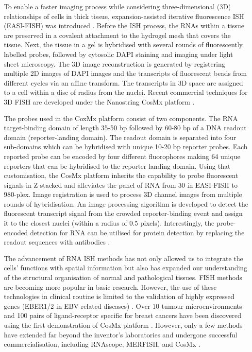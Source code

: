 To enable a faster imaging process while considering three-dimensional (3D) relationships of cells in thick tissue, expansion-assisted iterative fluorescence ISH (EASI-FISH) was introduced \cite{wang2021easi, borm2022scalable}. Before the ISH process, the RNAs within a tissue are preserved in a covalent attachment to the hydrogel mesh that covers the tissue. Next, the tissue in a gel is hybridised with several rounds of fluorescently labelled probes, followed by cytosolic DAPI staining and imaging under light sheet microscopy. The 3D image reconstruction is generated by registering multiple 2D images of DAPI images and the transcripts of fluorescent beads from different cycles via an affine transform. The transcripts in 3D space are assigned to a cell within a disc of radius from the nuclei. Recent commercial techniques for 3D FISH are developed under the Nanostring CosMx platform \cite{he2022high}.  

The probes used in the CoxMx platform consist of two components. The RNA target-binding domain of length 35-50 bp followed by 60-80 bp of a DNA readout domain (reporter-landing domain). The readout domain is separated into four sub-domains which can be hybridised with unique 10-20 bp reporter probes. Each reported probe can be encoded by four different fluorophores making 64 unique reporters that can be hybridised to the reporter-landing domain. Using that customisation, the CosMx platform inherits the capability to probe fluorescent signals in Z-stacked and alleviates the panel of RNA from 30 in EASI-FISH to 980-plex. Image registration is used to process 3D channel images from multiple rounds of hybridisation. An image processing algorithm is developed to detect the fluorescent transcript signal from the crowded reporter-binding event and assign it to the closest nuclei (within a radius of 0.5 pixels). Interestingly, the probe-encoded detection for RNA can be utilised for protein detection by replacing the readout sequences with antibodies \cite{he2022high}.   

The advancement of RNA ISH methods has not only allowed us to integrate the cells' functions with spatial information but also has expanded our understanding of the structural organisation of normal and pathological tissues. FISH methods are becoming more popular in basic research. However, the use of these technologies in clinical routine is limited to the validation of highly expressed genes (\ie EBER1/2 in EBV-related diseases) \cite{gulley2001molecular}. Over 10 tumour microenvironments and 100 pairs of ligand-receptor specific for breast cancers have been discovered using the first demonstration of CosMx platform \cite{he2022high}. However, only a few methods have extended far beyond the inventor's laboratories and undergone successful commercialisation, including RNAscope, MERFISH, and CosMx \cite{conrad2022single}. 


